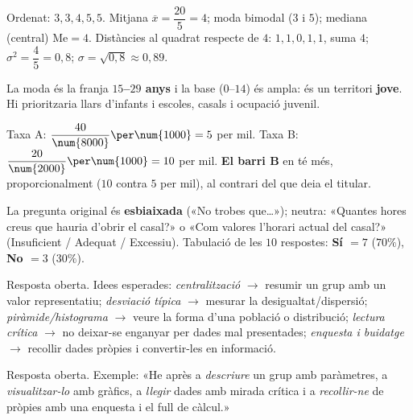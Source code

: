 \begin{solucions}
\begin{sollist}
  \item Ordenat: $3,3,4,5,5$. Mitjana $\overline{x}=\dfrac{20}{5}=4$; moda bimodal
        ($3$ i $5$); mediana (central) $\text{Me}=4$. Distàncies al quadrat respecte de
        $4$: $1,1,0,1,1$, suma $4$; $\sigma^2=\dfrac{4}{5}=0,8$;
        $\sigma=\sqrt{0,8}\approx 0,89$.
  \item La moda és la franja \textbf{$15$–$29$ anys} i la base ($0$–$14$) és ampla: és
        un territori \textbf{jove}. Hi prioritzaria llars d'infants i escoles, casals i
        ocupació juvenil.
  \item Taxa A: $\dfrac{40}{\num{8000}}\per\num{1000}=5$ per mil. Taxa B:
        $\dfrac{20}{\num{2000}}\per\num{1000}=10$ per mil. \textbf{El barri B} en té
        més, proporcionalment ($10$ contra $5$ per mil), al contrari del que deia el
        titular.
  \item La pregunta original és \textbf{esbiaixada} («No trobes que\dots»); neutra:
        «Quantes hores creus que hauria d'obrir el casal?» o «Com valores l'horari
        actual del casal?» (Insuficient / Adequat / Excessiu). Tabulació de les $10$
        respostes: \textbf{Sí $=7$} ($70\%$), \textbf{No $=3$} ($30\%$).
  \item Resposta oberta. Idees esperades: \emph{centralització} $\rightarrow$ resumir
        un grup amb un valor representatiu; \emph{desviació típica} $\rightarrow$
        mesurar la desigualtat/dispersió; \emph{piràmide/histograma} $\rightarrow$
        veure la forma d'una població o distribució; \emph{lectura crítica}
        $\rightarrow$ no deixar-se enganyar per dades mal presentades; \emph{enquesta i
        buidatge} $\rightarrow$ recollir dades pròpies i convertir-les en informació.
  \item Resposta oberta. Exemple: «He après a \emph{descriure} un grup amb paràmetres,
        a \emph{visualitzar-lo} amb gràfics, a \emph{llegir} dades amb mirada crítica i
        a \emph{recollir-ne} de pròpies amb una enquesta i el full de càlcul.»
\end{sollist}
\end{solucions}
